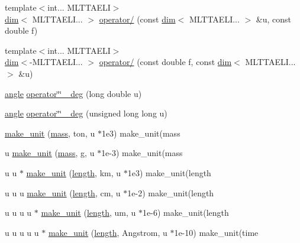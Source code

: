 \begin{DoxyCompactItemize}
\item 
{\footnotesize template$<$int... M\+L\+T\+T\+A\+E\+LI$>$ }\\\hyperlink{structmui_1_1dim_1_1dim}{dim}$<$ M\+L\+T\+T\+A\+E\+L\+I... $>$ \hyperlink{namespacemui_1_1dim_a319dd43052003ab564cc2aefd879b543}{operator/} (const \hyperlink{structmui_1_1dim_1_1dim}{dim}$<$ M\+L\+T\+T\+A\+E\+L\+I... $>$ \&u, const double f)
\item 
{\footnotesize template$<$int... M\+L\+T\+T\+A\+E\+LI$>$ }\\\hyperlink{structmui_1_1dim_1_1dim}{dim}$<$-\/M\+L\+T\+T\+A\+E\+L\+I... $>$ \hyperlink{namespacemui_1_1dim_a606f4351b9860a1244749e86547a343c}{operator/} (const double f, const \hyperlink{structmui_1_1dim_1_1dim}{dim}$<$ M\+L\+T\+T\+A\+E\+L\+I... $>$ \&u)
\item 
\hyperlink{namespacemui_1_1dim_a967db7ab1d1127cdb94fe084e592d1e0}{angle} \hyperlink{namespacemui_1_1dim_af5daf34b437f46b2ef72c84d1033d9cc}{operator\char`\"{}\char`\"{} \+\_\+deg} (long double u)
\item 
\hyperlink{namespacemui_1_1dim_a967db7ab1d1127cdb94fe084e592d1e0}{angle} \hyperlink{namespacemui_1_1dim_ab22fa587aa8b765a1055f93daf2ae9ec}{operator\char`\"{}\char`\"{} \+\_\+deg} (unsigned long long u)
\item 
\hyperlink{namespacemui_1_1dim_a0c3efce89a5c9d83b972a3e8d76a1a46}{make\+\_\+unit} (\hyperlink{namespacemui_1_1dim_a7b17424f4316e37d7970ee09857ccddf}{mass}, ton, u $\ast$1e3) make\+\_\+unit(mass
\item 
u \hyperlink{namespacemui_1_1dim_a75a325dba4b8418cd26b7ba98620c6ee}{make\+\_\+unit} (\hyperlink{namespacemui_1_1dim_a7b17424f4316e37d7970ee09857ccddf}{mass}, g, u $\ast$1e-\/3) make\+\_\+unit(mass
\item 
u u $\ast$ \hyperlink{namespacemui_1_1dim_a7ee1fac88aeb1c25bb5322f8cce98459}{make\+\_\+unit} (\hyperlink{namespacemui_1_1dim_ade9a9679bc46e16322ef419974faebe6}{length}, km, u $\ast$1e3) make\+\_\+unit(length
\item 
u u u \hyperlink{namespacemui_1_1dim_a0d1bd6ac4c480b2a07fa322573dbb6a7}{make\+\_\+unit} (\hyperlink{namespacemui_1_1dim_ade9a9679bc46e16322ef419974faebe6}{length}, cm, u $\ast$1e-\/2) make\+\_\+unit(length
\item 
u u u u $\ast$ \hyperlink{namespacemui_1_1dim_a57c28639a26b227855cce024cbb3a3b6}{make\+\_\+unit} (\hyperlink{namespacemui_1_1dim_ade9a9679bc46e16322ef419974faebe6}{length}, um, u $\ast$1e-\/6) make\+\_\+unit(length
\item 
u u u u u $\ast$ \hyperlink{namespacemui_1_1dim_a23033b8d420d5c889c3198fe37026507}{make\+\_\+unit} (\hyperlink{namespacemui_1_1dim_ade9a9679bc46e16322ef419974faebe6}{length}, Angstrom, u $\ast$1e-\/10) make\+\_\+unit(time

\end{DoxyCompactItemize}
